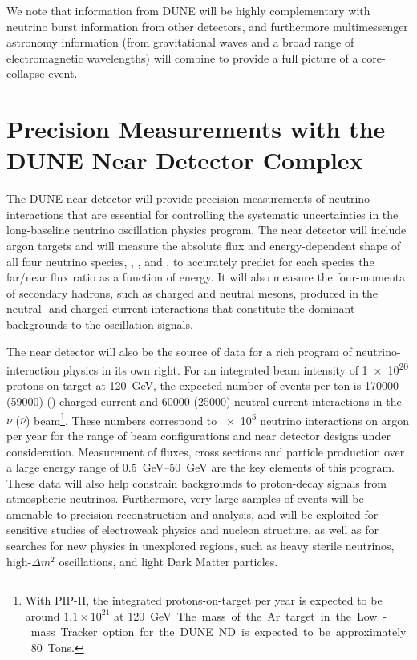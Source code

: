 We note that information from DUNE will be highly complementary with neutrino burst information from other detectors, and furthermore multimessenger astronomy information (from gravitational waves and a broad range of electromagnetic wavelengths) will combine to provide a full picture of a core-collapse event.



\section{Precision Measurements with the DUNE Near Detector Complex}
\label{sec:exec-summ-nd-precision-physics}

The DUNE near detector
will provide precision measurements of
neutrino interactions that are essential
for controlling the systematic uncertainties in the long-baseline neutrino 
oscillation physics program.  The near detector 
will include argon targets and will measure the absolute flux and energy-dependent
shape of all four neutrino species, \numu, \anumu, \nue and \anue,
to accurately predict for each species the
far/near flux ratio as a function of energy.  It will also measure the
four-momenta of secondary hadrons, such as charged and neutral mesons,
produced in the neutral- and charged-current interactions that
constitute the dominant backgrounds to the oscillation signals.

The near detector will also be the source of data for a rich program
of neutrino-interaction physics in its own right. For an integrated
beam intensity of \num{1e20} 
protons-on-target at \SI{120}{GeV}, the expected number of events per
ton is \num{170000} (\num{59000}) 
\numu (\anumu) charged-current and \num{60000} (\num{25000}) neutral-current interactions in the $\nu$ ($\overline\nu$) beam\footnote{With PIP-II, the integrated protons-on-target per year is
  expected to be around $1.1\times 10^{21}$ at \SI{120}\GeV. The mass
  of the Ar target in the Low-mass Tracker option for the DUNE ND is expected to be approximately
  80 Tons.}. 
  These numbers correspond to \num{e5} neutrino interactions
on argon per year for the range of beam configurations and near detector
designs under consideration.  Measurement of fluxes, cross sections
and particle production over a large energy range of
\SIrange{0.5}{50}{\GeV} are the key elements of this program.  These
data will also help constrain backgrounds to proton-decay signals
from atmospheric neutrinos.  Furthermore, very large samples of events
will be amenable to precision reconstruction and analysis, and will be
exploited for sensitive studies of electroweak physics and nucleon
structure, as well as for searches for new physics in unexplored
regions, such as heavy sterile neutrinos, high-$\Delta m^2$
oscillations, and light Dark Matter particles. %

